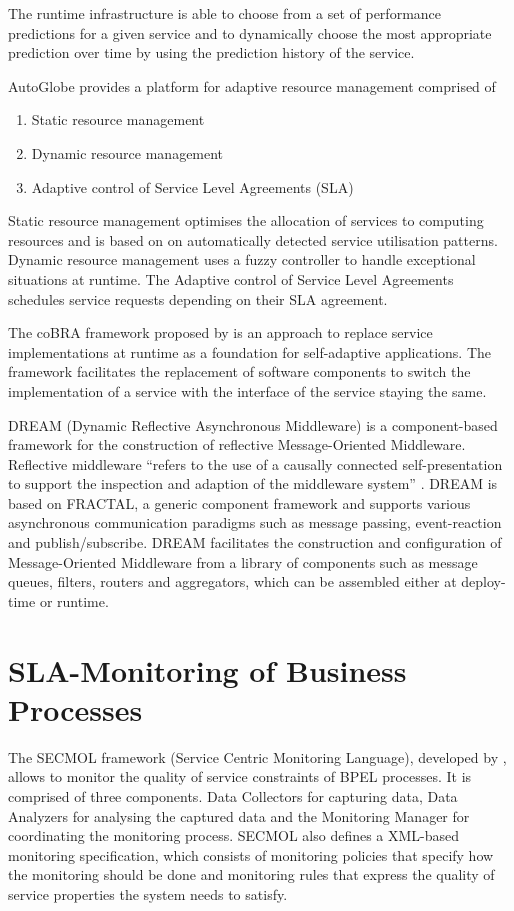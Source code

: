 The runtime infrastructure is able to choose from a set of performance predictions for a given service and to dynamically choose the most appropriate prediction over time by using the prediction history of the service.

AutoGlobe \citep{Gmach:2008vo} provides a platform for adaptive resource management comprised of 
\begin{enumerate}
	\item Static resource management
	\item Dynamic resource management
	\item Adaptive control of Service Level Agreements (SLA)
\end{enumerate}
Static resource management optimises the allocation of services to computing resources and is based on on automatically detected service utilisation patterns. Dynamic resource management uses a fuzzy controller to handle exceptional situations at runtime. The Adaptive control of Service Level Agreements schedules service requests depending on their SLA agreement.

The coBRA framework proposed by \citet{Irmert:2008nx} is an approach to replace service implementations at runtime as a foundation for self-adaptive applications. The framework facilitates the replacement of software components to switch the implementation of a service with the interface of the service staying the same.

DREAM (Dynamic Reflective Asynchronous Middleware) \citep{Leclercq:2004ly} is a component-based framework for the construction of reflective Message-Oriented Middleware. Reflective middleware ``refers to the use of a causally connected self-presentation to support the inspection and adaption of the middleware system'' \citep{Kon:2002fu}. DREAM is based on FRACTAL, a generic component framework and supports various asynchronous communication paradigms such as message passing, event-reaction and publish/subscribe. DREAM facilitates the construction and configuration of Message-Oriented Middleware from a library of components such as message queues, filters, routers and aggregators, which can be assembled either at deploy-time or runtime.
\section{SLA-Monitoring of Business Processes}
The SECMOL framework (Service Centric Monitoring Language), developed by \citet{Guinea:2009fk}, allows to monitor the quality of service constraints of BPEL processes. It is comprised of three components. Data Collectors for capturing data, Data Analyzers for analysing the captured data and the Monitoring Manager for coordinating the monitoring process. SECMOL also defines a XML-based monitoring specification, which consists of monitoring policies that specify how the monitoring should be done and monitoring rules that express the quality of service properties the system needs to satisfy.

